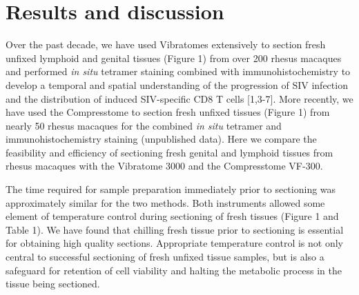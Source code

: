 \documentclass{article}
\begin{document}
\section*{Results and discussion}

Over the past decade, we have used Vibratomes extensively to section fresh unfixed lymphoid and genital tissues (Figure 1) from over 200 rhesus macaques and performed \textit{in situ} tetramer staining combined with immunohistochemistry to develop a temporal and spatial understanding of the progression of SIV infection and the distribution of induced SIV-specific CD8 T cells [1,3-7]. More recently, we have used the Compresstome to section fresh unfixed tissues (Figure 1) from nearly 50 rhesus macaques for the combined \textit{in situ} tetramer and immunohistochemistry staining (unpublished data). Here we compare the feasibility and efficiency of sectioning fresh genital and lymphoid tissues from rhesus macaques with the Vibratome 3000 and the Compresstome VF-300.

The time required for sample preparation immediately prior to sectioning was approximately similar for the two methods. Both instruments allowed some element of temperature control during sectioning of fresh tissues (Figure 1 and Table 1). We have found that chilling fresh tissue prior to sectioning is essential for obtaining high quality sections. Appropriate temperature control is not only central to successful sectioning of fresh unfixed tissue samples, but is also a safeguard for retention of cell viability and halting the metabolic process in the tissue being sectioned.
\end{document}

